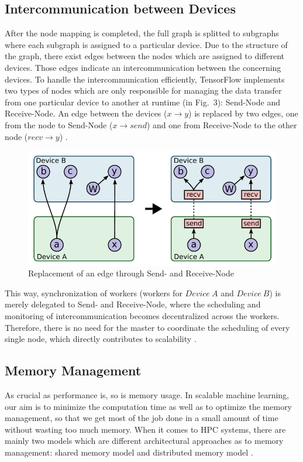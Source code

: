 \documentclass[ieeetran]{article}
\begin{document}
\subsection{Intercommunication between Devices} %
\label{sub:intercommunication_between_devices}
After the node mapping is completed, the full graph is splitted to subgraphs where each subgraph is assigned to a particular device. Due to the structure of the graph, there exist edges between the nodes which are assigned to different devices. Those edges indicate an intercommunication between the concerning devices. To handle the intercommunication efficiently, TensorFlow implements two types of nodes which are only responsible for managing the data transfer from one particular device to another at runtime (in Fig.\ 3): Send-Node and Receive-Node. An edge between the devices ($x \rightarrow y$) is replaced by two edges, one from the node to Send-Node ($x \rightarrow send$) and one from Receive-Node to the other node ($recv \rightarrow y$) \cite{first}.

\begin{figure}[h!]
  \centering
  \includegraphics[width=0.5\linewidth]{intercommunication}
  \caption{Replacement of an edge through Send- and Receive-Node}
  \label{fig:intercommunication}
\end{figure}
\hspace{-0.52cm}This way, synchronization of workers (workers for $Device \ A$ and $Device\ B$) is merely delegated to Send- and Receive-Node, where the scheduling and monitoring of intercommunication becomes decentralized across the workers. Therefore, there is no need for the master to coordinate the scheduling of every single node, which directly contributes to scalability \cite{first}.

\subsection{Memory Management} %
\label{sub:memory_management}
As crucial as performance is, so is memory usage. In scalable machine learning, our aim is to minimize the computation time as well as to optimize the memory management, so that we get most of the job done in a small amount of time without wasting too much memory. When it comes to HPC systems, there are mainly two models which are different architectural approaches as to memory management: shared memory model and distributed memory model \cite{second}.
\end{document}
